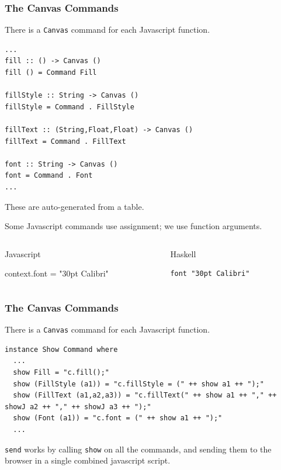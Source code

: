 \documentclass{beamer}
\begin{document}
\begin{frame}[fragile]
\frametitle{The Canvas Commands}

There is a {\tt Canvas} command for each Javascript function.

\begin{codeblock}[0.6]
\tiny
\begin{verbatim}
...
fill :: () -> Canvas ()
fill () = Command Fill

fillStyle :: String -> Canvas ()
fillStyle = Command . FillStyle

fillText :: (String,Float,Float) -> Canvas ()
fillText = Command . FillText

font :: String -> Canvas ()
font = Command . Font
...
\end{verbatim}
\end{codeblock}

\frameskip
These are auto-generated from a table.

\frameskip
Some Javascript commands use assignment; we use function arguments.

\begin{columns}
\begin{column}{0.50\textwidth}
\begin{codeblock*}[0.80]{Javascript}
\footnotesize
\begin{semiverbatim}
context.font \alert{=} "30pt Calibri"
\end{semiverbatim}
\end{codeblock*}
\end{column}

\begin{column}{0.50\textwidth}
\begin{codeblock*}[0.52]{Haskell}
\footnotesize
\begin{verbatim}
font "30pt Calibri"
\end{verbatim}
\end{codeblock*}
\end{column}

\end{columns}

\end{frame}

\begin{frame}[fragile]
\frametitle{The Canvas Commands}

There is a {\tt Canvas} command for each Javascript function.

\begin{codeblock}[1]
\tiny
\begin{verbatim}
instance Show Command where
  ...
  show Fill = "c.fill();"
  show (FillStyle (a1)) = "c.fillStyle = (" ++ show a1 ++ ");"
  show (FillText (a1,a2,a3)) = "c.fillText(" ++ show a1 ++ "," ++ showJ a2 ++ "," ++ showJ a3 ++ ");"
  show (Font (a1)) = "c.font = (" ++ show a1 ++ ");"
  ...
\end{verbatim}
\end{codeblock}

\frameskip
{\tt send} works by calling {\tt show} on all the commands, and sending them to the browser
in a single combined javascript script.
\end{frame}
\end{document}
